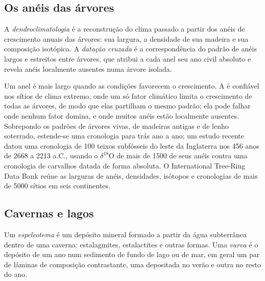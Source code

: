 \subsection*{Os anéis das árvores}

\begin{definition}\label{def:b2:climate-proxies:dendro}
A \emph{dendroclimatologia} é a reconstrução do clima passado a partir dos
anéis de crescimento anuais das árvores: sua largura, a densidade de sua madeira e sua composição
isotópica. A \emph{datação cruzada} é a correspondência do padrão de anéis largos e
estreitos entre árvores, que atribui a cada anel seu ano civil absoluto e revela
anéis localmente ausentes numa árvore isolada.
\end{definition}

Um anel é mais largo quando as condições favorecem o crescimento. A  é confiável nos sítios de clima extremo, onde um só
fator climático limita o crescimento de todas as árvores, de modo que elas partilham o mesmo padrão; ela pode
falhar onde nenhum fator domina, e onde muitos anéis estão localmente ausentes.
Sobrepondo os padrões de árvores vivas, de madeiras antigas e de lenho soterrado, estende-se uma cronologia para trás
ano a ano; um estudo recente datou uma cronologia de 100 teixos subfósseis do leste da Inglaterra nos
456 anos de 2668 a 2213 a.C., usando o $\delta^{18}$O de mais de \num{1500} de seus anéis
contra uma cronologia de carvalhos datada de forma absoluta. O International Tree-Ring Data Bank reúne as larguras
de anéis, densidades, isótopos e cronologias de mais de \num{5000} sítios em seis continentes.

\subsection*{Cavernas e lagos}

\begin{definition}\label{def:b2:climate-proxies:archives}
Um \emph{espeleotema} é um depósito mineral formado a partir da água subterrânea dentro de uma
caverna: estalagmites, estalactites e outras formas. Uma \emph{varva} é
o depósito de um ano num sedimento de fundo de lago ou de mar, em geral um par de lâminas de composição
contrastante, uma depositada no verão e outra no resto do ano.
\end{definition}

